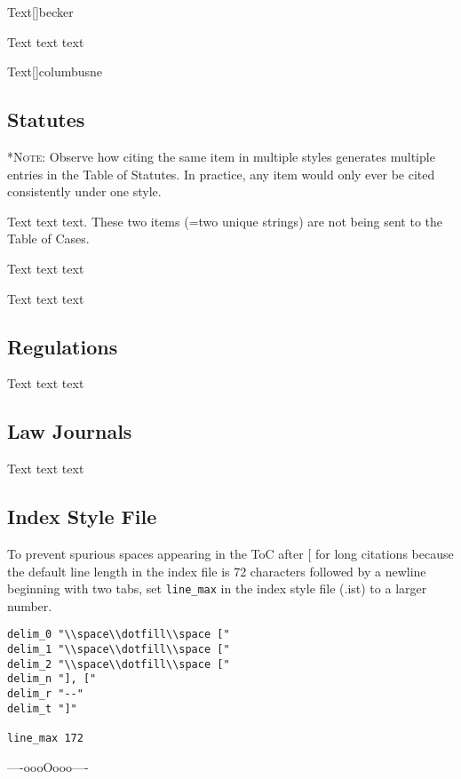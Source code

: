 \noindent{}Text[]{becker}

\p Text text text 

\noindent{}Text[]{columbusne}


\subsection*{Statutes}
*{\small \textsc{Note}: Observe how citing the same item in multiple styles generates multiple entries in the Table of Statutes. In practice, any item would only ever be cited consistently under one style.}
\bigskip 

\p Text text text. These two items (=two unique strings) are not being sent to the Table of Cases. 

\lcsetindexingoff{}\lcsetindexingon
\bigskip 

\p Text text text 

\bigskip 

\p Text text text 

\bigskip 


\subsection*{Regulations}

\p Text text text 

\bigskip 


\subsection*{Law Journals}

\p Text text text 

\bigskip 

\subsection*{Index Style File}
\p To prevent spurious spaces appearing in the ToC after [ for long citations because the default line length in the index file is 72 characters followed by a newline beginning with two tabs, set \verb|line_max| in the index style file (.ist) to a larger number.

\begin{verbatim}
delim_0 "\\space\\dotfill\\space ["
delim_1 "\\space\\dotfill\\space ["
delim_2 "\\space\\dotfill\\space ["
delim_n "], ["
delim_r "--"
delim_t "]"

line_max 172

\end{verbatim}
\bigskip 


\hfill ----oooOooo---- \hfill\ 
